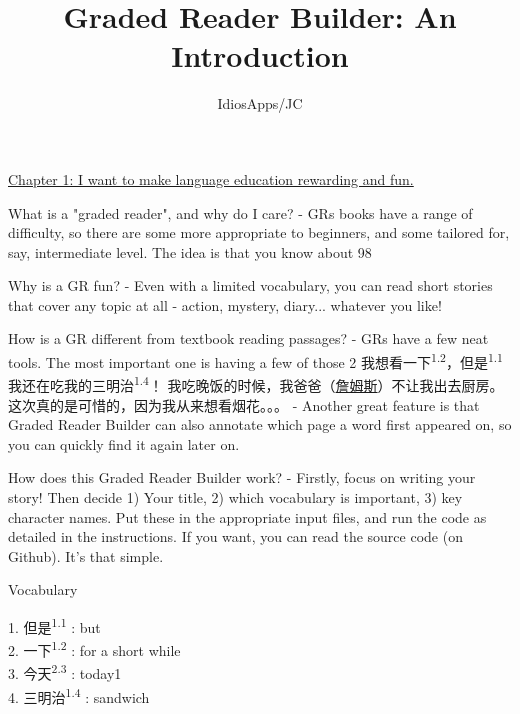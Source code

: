 \documentclass{report}
\title{Graded Reader Builder: An Introduction}
\author{IdiosApps/JC}
\begin{document}
\maketitle
\clearpage
\clearpage
{\centering \large
{\uline{Chapter 1: I want to make language education rewarding and fun.}}\\}

What is a "graded reader", and why do I care?
- GRs books have a range of difficulty, so there are some more appropriate to beginners, and some tailored for, say, intermediate level. The idea is that you know about 98%

Why is a GR fun?
- Even with a limited vocabulary, you can read short stories that cover any topic at all - action, mystery, diary... whatever you like!

How is a GR different from textbook reading passages?
- GRs have a few neat tools. The most important one is having a few of those 2%
我想看一下\textsuperscript{1.2}，但是\textsuperscript{1.1}我还在吃我的三明治\textsuperscript{1.4}！ 我吃晚饭的时候，我爸爸（\uline{詹姆斯}）不让我出去厨房。这次真的是可惜的，因为我从来想看烟花。。。
- Another great feature is that Graded Reader Builder can also annotate which page a word first appeared on, so you can quickly find it again later on.

How does this Graded Reader Builder work?
- Firstly, focus on writing your story! Then decide 1) Your title, 2) which vocabulary is important, 3) key character names. Put these in the appropriate input files, and run the code as detailed in the instructions. If you want, you can read the source code (on Github). It's that simple.
\clearpage
\setlength{\parindent}{0ex}
\centerline{Vocabulary}
1. 但是\textsuperscript{1.1} : but\\
2. 一下\textsuperscript{1.2} : for a short while\\
3. 今天\textsuperscript{2.3} : today1\\
4. 三明治\textsuperscript{1.4} : sandwich\\
\end{document}
